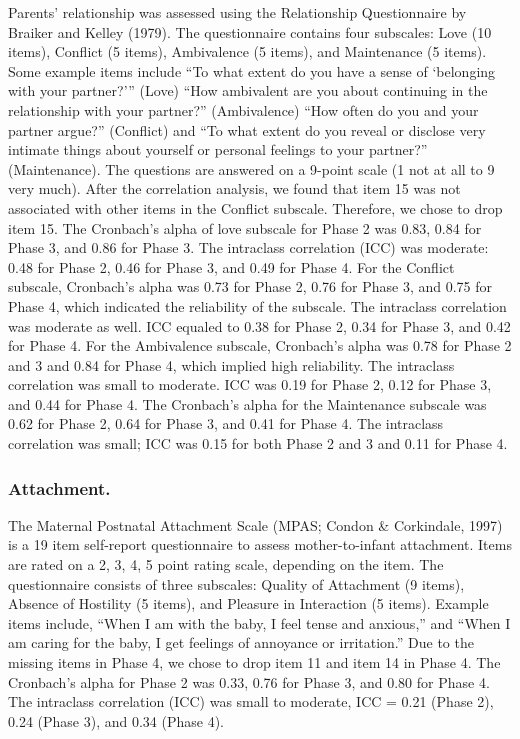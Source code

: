 \documentclass[man]{apa6}
\begin{document}
Parents' relationship was assessed using the Relationship Questionnaire by Braiker and Kelley (1979). The questionnaire contains four subscales: Love (10 items), Conflict (5 items), Ambivalence (5 items), and Maintenance (5 items). Some example items include \enquote{To what extent do you have a sense of \enquote{belonging with your partner?}} (Love) \enquote{How ambivalent are you about continuing in the relationship with your partner?} (Ambivalence) \enquote{How often do you and your partner argue?} (Conflict) and \enquote{To what extent do you reveal or disclose very intimate things about yourself or personal feelings to your partner?} (Maintenance). The questions are answered on a 9-point scale (1 not at all to 9 very much). After the correlation analysis, we found that item 15 was not associated with other items in the Conflict subscale. Therefore, we chose to drop item 15. The Cronbach's alpha of love subscale for Phase 2 was 0.83, 0.84 for Phase 3, and 0.86 for Phase 3. The intraclass correlation (ICC) was moderate: 0.48 for Phase 2, 0.46 for Phase 3, and 0.49 for Phase 4. For the Conflict subscale, Cronbach's alpha was 0.73 for Phase 2, 0.76 for Phase 3, and 0.75 for Phase 4, which indicated the reliability of the subscale. The intraclass correlation was moderate as well. ICC equaled to 0.38 for Phase 2, 0.34 for Phase 3, and 0.42 for Phase 4. For the Ambivalence subscale, Cronbach's alpha was 0.78 for Phase 2 and 3 and 0.84 for Phase 4, which implied high reliability. The intraclass correlation was small to moderate. ICC was 0.19 for Phase 2, 0.12 for Phase 3, and 0.44 for Phase 4. The Cronbach's alpha for the Maintenance subscale was 0.62 for Phase 2, 0.64 for Phase 3, and 0.41 for Phase 4. The intraclass correlation was small; ICC was 0.15 for both Phase 2 and 3 and 0.11 for Phase 4.

\hypertarget{attachment.}{%
\subsubsection{Attachment.}\label{attachment.}}

The Maternal Postnatal Attachment Scale (MPAS; Condon \& Corkindale, 1997) is a 19 item self-report questionnaire to assess mother-to-infant attachment. Items are rated on a 2, 3, 4, 5 point rating scale, depending on the item. The questionnaire consists of three subscales: Quality of Attachment (9 items), Absence of Hostility (5 items), and Pleasure in Interaction (5 items). Example items include, \enquote{When I am with the baby, I feel tense and anxious,} and \enquote{When I am caring for the baby, I get feelings of annoyance or irritation.} Due to the missing items in Phase 4, we chose to drop item 11 and item 14 in Phase 4. The Cronbach's alpha for Phase 2 was 0.33, 0.76 for Phase 3, and 0.80 for Phase 4. The intraclass correlation (ICC) was small to moderate, ICC = 0.21 (Phase 2), 0.24 (Phase 3), and 0.34 (Phase 4).
\end{document}

